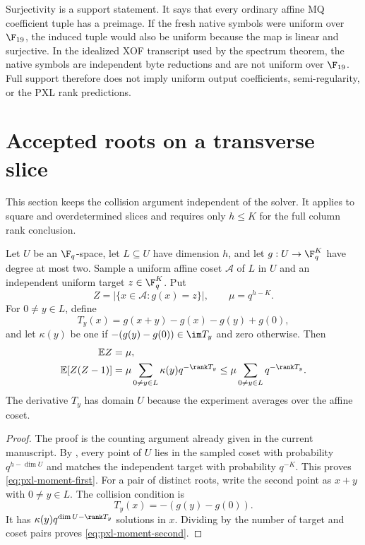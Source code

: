 Surjectivity is a support statement.  It says that every ordinary affine MQ
coefficient tuple has a preimage.  If the fresh native symbols were uniform
over $\F_{19}$, the induced tuple would also be uniform because the map is
linear and surjective.  In the idealized XOF transcript used by the spectrum
theorem, the native symbols are independent byte reductions and are not
uniform over $\F_{19}$.  Full support therefore does not imply uniform output
coefficients, semi-regularity, or the PXL rank predictions.

\section{Accepted roots on a transverse slice}
\label{sec:pxl-root-probability}

This section keeps the collision argument independent of the solver.  It
applies to square and overdetermined slices and requires only $h\le K$ for
the full column rank conclusion.

\begin{theorem}
\label{thm:collision-identity}
Let $U$ be an $\F_q$-space, let $L\subseteq U$ have dimension $h$, and let
$g:U\to\F_q^K$ have degree at most two.  Sample a uniform affine coset
$\mathcal A$ of $L$ in $U$ and an independent uniform target
$z\in\F_q^K$.  Put
\[
 Z=|\{x\in\mathcal A:g(x)=z\}|,
 \qquad \mu=q^{h-K}.
\]
For $0\ne y\in L$, define
\[
 T_y(x)=g(x+y)-g(x)-g(y)+g(0),
\]
and let $\kappa(y)$ be one if
$-(g(y)-g(0))\in\im T_y$ and zero otherwise.  Then
\begin{align}
 \mathbb EZ&=\mu,                                      \label{eq:pxl-moment-first}\\
 \mathbb E[Z(Z-1)]
 &=\mu\sum_{0\ne y\in L}\kappa(y)q^{-\rank T_y}
 \le\mu\sum_{0\ne y\in L}q^{-\rank T_y}.             \label{eq:pxl-moment-second}
\end{align}
The derivative $T_y$ has domain $U$ because the experiment averages over the
affine coset.
\end{theorem}

\begin{proof}
The proof is the counting argument already given in the current manuscript.
By , every point of $U$ lies in the sampled coset
with probability $q^{h-\dim U}$ and matches the independent target with
probability $q^{-K}$.  This proves \eqref{eq:pxl-moment-first}.  For a pair of
distinct roots, write the second point as $x+y$ with $0\ne y\in L$.  The
collision condition is
\[
 T_y(x)=-(g(y)-g(0)).
\]
It has $\kappa(y)q^{\dim U-\rank T_y}$ solutions in $x$.  Dividing by the
number of target and coset pairs proves \eqref{eq:pxl-moment-second}.
\end{proof}

